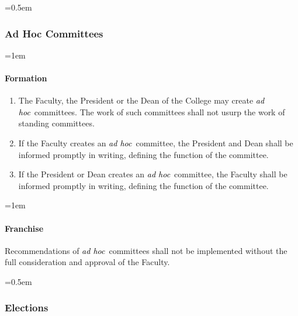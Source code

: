 \documentclass{manual}
\newcommand{\keyword}[1]{\textcolor{black}{#1}}
\newcommand{\adho}{\keyword{\textit{ad hoc}}~}
\let\oldsubsubsection\subsubsection
\renewcommand\subsubsection{\leftskip=0.5em\oldsubsubsection}
\let\oldparagraph\paragraph
\renewcommand\paragraph{\leftskip=1em\oldparagraph}
\newcommand{\itemLevelA}{\alph*.}
\newcommand{\itemRefA}{\alph*}
\begin{document}
\subsubsection{Ad Hoc Committees}

\paragraph{Formation}
\begin{enumerate}[label=\itemLevelA,ref=\itemRefA]

\item The Faculty, the President or the Dean of the College may create \adho committees. The work of such committees shall not usurp the work of standing committees.


\item If the Faculty creates an \adho committee, the President and Dean shall be informed promptly in writing, defining the function of the committee.


\item If the President or Dean creates an \adho committee, the Faculty shall be informed promptly in writing, defining the function of the committee.
\end{enumerate}


\paragraph{Franchise}
Recommendations of \adho committees shall not be implemented without the full consideration and approval of the Faculty.


\subsubsection{Elections}\label{sub:Elections}
\end{document}
